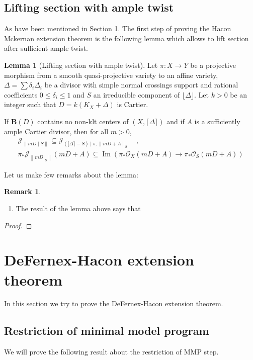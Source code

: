 \documentclass[11pt]{article}
\theoremstyle{definition}
\newtheorem{lemma}[theorem]{Lemma}
\newtheorem{remark}[theorem]{Remark}
\begin{document}
	\subsection{Lifting section with ample twist}
	As have been mentioned in Section 1. The first step of proving the Hacon Mckernan extension theorem is the following lemma which allows to lift section after sufficient ample twist.
	\begin{lemma}[Lifting section with ample twist]
		Let $\pi: X \rightarrow Y$ be a projective morphism from a smooth quasi-projective variety to an affine variety, $\Delta=\sum \delta_i \Delta_i$ be a divisor with simple normal crossings support and rational coefficients $0 \leq \delta_i \leq 1$ and $S$ an irreducible component of $\lfloor\Delta\rfloor$. Let $k>0$ be an integer such that $D=k\left(K_X+\Delta\right)$ is Cartier. 
		
		If $\mathbf{B}(D)$ contains no non-klt centers of $(X,\lceil\Delta\rceil)$ and if $A$ is a sufficiently ample Cartier divisor, then for all $m>0$,
		$$
		\begin{gathered}
			\mathscr{J}_{\|m D \mid S\|} \subseteq \mathscr{J}_{([\Delta\rceil-S) \mid s,\|m D+A\|_S} \quad , \\
			\pi_* \mathscr{J}_{\left\|\left.m D\right|_S\right\|}(m D+A) \subseteq \operatorname{Im}\left(\pi_* \mathscr{O}_X(m D+A) \rightarrow \pi_* \mathscr{O}_S(m D+A)\right)
		\end{gathered}
		$$
		
	\end{lemma}
	Let us make few remarks about the lemma:
	\begin{remark}
		\begin{enumerate}
			\item The result of the lemma above says that 
		\end{enumerate}
	\end{remark}
	\begin{proof}
		
	\end{proof}
	
	\section{DeFernex-Hacon extension theorem}
	In this section we try to prove the DeFernex-Hacon extension theorem.
	
	\subsection{Restriction of minimal model program}
	We will prove the following result about the restriction of MMP step.
	
\end{document}
